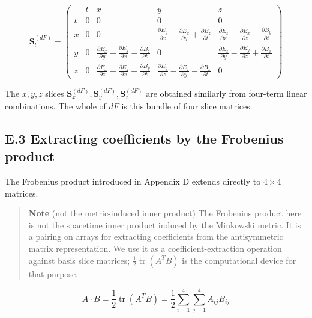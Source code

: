 \[
\mathbf{S}_{t}^{(dF)}
{=}
\left(\begin{array}{c|cccc}
 & t & x & y & z \\\hline
t & 0 & 0 & 0 & 0 \\[6pt]
x & 0 & 0 &
\displaystyle \frac{\partial E_y}{\partial x} - \frac{\partial E_x}{\partial y} + \frac{\partial B_z}{\partial t} &
\displaystyle \frac{\partial E_z}{\partial x} - \frac{\partial E_x}{\partial z} - \frac{\partial B_y}{\partial t} \\[14pt]
y & 0 &
\displaystyle \frac{\partial E_x}{\partial y} - \frac{\partial E_y}{\partial x} - \frac{\partial B_z}{\partial t} &
0 &
\displaystyle \frac{\partial E_z}{\partial y} - \frac{\partial E_y}{\partial z} + \frac{\partial B_x}{\partial t} \\[14pt]
z & 0 &
\displaystyle \frac{\partial E_x}{\partial z} - \frac{\partial E_z}{\partial x} + \frac{\partial B_y}{\partial t} &
\displaystyle \frac{\partial E_y}{\partial z} - \frac{\partial E_z}{\partial y} - \frac{\partial B_x}{\partial t} &
0
\end{array}\right)
\]

The \(x,y,z\) slices
\(\mathbf{S}_{x}^{(dF)}, \mathbf{S}_{y}^{(dF)}, \mathbf{S}_{z}^{(dF)}\)
are obtained similarly from four-term linear combinations. The whole of
\(dF\) is this bundle of four slice matrices.

\hypertarget{e.3-extracting-coefficients-by-the-frobenius-product}{%
\subsection{E.3 Extracting coefficients by the Frobenius
product}\label{e.3-extracting-coefficients-by-the-frobenius-product}}

The Frobenius product introduced in Appendix D extends directly to
\(4\times4\) matrices.

\begin{quote}
\textbf{Note} (not the metric-induced inner product) The Frobenius
product here is not the spacetime inner product induced by the Minkowski
metric. It is a pairing on arrays for extracting coefficients from the
antisymmetric matrix representation. We use it as a
coefficient-extraction operation against basis slice matrices;
\(\frac{1}{2}\operatorname{tr}(A^T B)\) is the computational device for
that purpose.
\end{quote}

\[
A \cdot B = \frac{1}{2}\operatorname{tr}(A^T B) = \frac{1}{2}\sum_{i=1}^{4}\sum_{j=1}^{4} A_{ij}B_{ij}
\]

